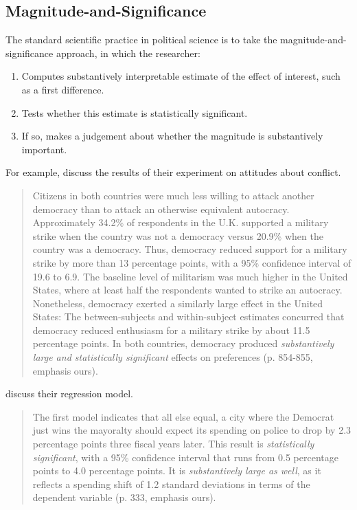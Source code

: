 \documentclass[12pt]{article}
\begin{document}
\subsection*{Magnitude-and-Significance}

The standard scientific practice in political science is to take the magnitude-and-significance approach, in which the researcher: 

\begin{enumerate}
\item Computes substantively interpretable estimate of the effect of interest, such as a first difference.
\item Tests whether this estimate is statistically significant.
\item If so, makes a judgement about whether the magnitude is substantively important.
\end{enumerate}

For example, \cite{TomzWeeks2013} discuss the results of their experiment on attitudes about conflict.

\begin{quote}
Citizens in both countries were much less willing to attack another democracy than to attack an otherwise equivalent autocracy. Approximately 34.2\% of respondents in the U.K. supported a military strike when the country was not a democracy versus 20.9\% when the country was a democracy. Thus, democracy reduced support for a military strike by more than 13 percentage points, with a 95\% confidence interval of 19.6 to 6.9. The baseline level of militarism was much higher in the United States, where at least half the respondents wanted to strike an autocracy. Nonetheless, democracy exerted a similarly large effect in the United States: The between-subjects and within-subject estimates concurred that democracy reduced enthusiasm for a military strike by about 11.5 percentage points. In both countries, democracy produced \emph{substantively large and statistically significant} effects on preferences (p. 854-855, emphasis ours).
\end{quote}

\cite{GerberHopkins2011} discuss their regression model.

\begin{quote}
The first model indicates that all else equal, a city where the Democrat just wins the mayoralty should expect its spending on police to drop by 2.3 percentage points three fiscal years later. This result is \emph{statistically significant}, with a 95\% confidence interval that runs from 0.5 percentage points to 4.0 percentage points. It is \emph{substantively large as well}, as it reflects a spending shift of 1.2 standard deviations in terms of the dependent variable (p. 333, emphasis ours).
\end{quote}
\end{document}
